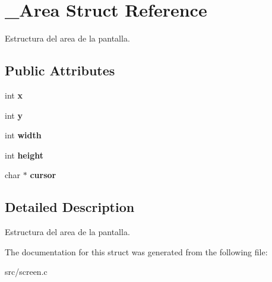\hypertarget{struct__Area}{\section{\+\_\+\+Area Struct Reference}
\label{struct__Area}
}


Estructura del area de la pantalla.  


\subsection*{Public Attributes}
\begin{DoxyCompactItemize}
\item 
\hypertarget{struct__Area_a093b8c2929094bac88bbf5ee7db85573}{int {\bfseries x}}\label{struct__Area_a093b8c2929094bac88bbf5ee7db85573}

\item 
\hypertarget{struct__Area_a867e601f05480db03237c3a17d4c77f8}{int {\bfseries y}}\label{struct__Area_a867e601f05480db03237c3a17d4c77f8}

\item 
\hypertarget{struct__Area_aa2f753fc3d254821603ac4512db814f1}{int {\bfseries width}}\label{struct__Area_aa2f753fc3d254821603ac4512db814f1}

\item 
\hypertarget{struct__Area_a22627de8e529d631c17157f1f68cb5ac}{int {\bfseries height}}\label{struct__Area_a22627de8e529d631c17157f1f68cb5ac}

\item 
\hypertarget{struct__Area_aa042b0549789b75fd133b67ad7d0fd9d}{char $\ast$ {\bfseries cursor}}\label{struct__Area_aa042b0549789b75fd133b67ad7d0fd9d}

\end{DoxyCompactItemize}


\subsection{Detailed Description}
Estructura del area de la pantalla. 

The documentation for this struct was generated from the following file\+:\begin{DoxyCompactItemize}
\item 
src/screen.\+c\end{DoxyCompactItemize}
